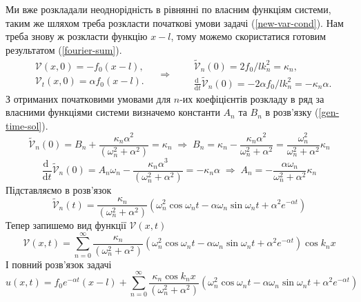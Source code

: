 Ми вже розкладали неоднорідність в рівнянні по власним функціям системи, таким же шляхом треба розкласти початкові умови задачі (\ref{new-var-cond}). Нам треба знову ж розкласти функцію $x - l$, тому можемо скористатися готовим результатом (\ref{fourier-sum}).
\begin{equation}
    \begin{aligned} %
        &\mathcal{V}(x,0) = - f_0 (x-l),\\
        &\mathcal{V}_t(x,0) = \alpha f_0 (x-l).
    \end{aligned} 
    \quad\Rightarrow\quad
    \begin{aligned} %
        &\widetilde{\mathcal{V}}_n(0) = 2 f_0/l k_n^2 = \kappa_n,\\
        &\frac{\mathrm{d}\;}{\mathrm{d}t}\widetilde{\mathcal{V}}_n(0) = -2\alpha f_0/lk_n^2 = -\kappa_n\alpha.
    \end{aligned} 
\end{equation}
З отриманих початковими умовами для $n$-их коефіцієнтів розкладу в ряд за власними функціями системи визначемо константи $A_n$ та $B_n$ в розв'язку (\ref{gen-time-sol}). 
\begin{equation*}
    \widetilde{\mathcal{V}}_n(0) = B_n + \frac{\kappa_n\alpha^2}{(\omega_n^2 + \alpha^2)} = \kappa_n
    \;\Rightarrow\;
    B_n  = \kappa_n - \frac{\kappa_n\alpha^2}{\omega_n^2 + \alpha^2} = \frac{\omega_n^2}{\omega_n^2 + \alpha^2} \kappa_n
\end{equation*}
\begin{equation*}
    \frac{\mathrm{d}\;}{\mathrm{d}t}\widetilde{\mathcal{V}}_n(0) = A_n\omega_n - \frac{\kappa_n\alpha^3}{(\omega_n^2 + \alpha^2)} = -\kappa_n\alpha
    \;\Rightarrow\;
    A_n = -\frac{\alpha\omega_n}{\omega_n^2 + \alpha^2} \kappa_n
\end{equation*}
Підставляємо в розв'язок
\begin{equation} \label{unic-time-sol}
    \widetilde{\mathcal{V}}_n(t) = \frac{\kappa_n}{(\omega_n^2 + \alpha^2)} \left(\omega_n^2\cos\omega_nt - \alpha\omega_n\sin\omega_nt +  \alpha^2e^{-\alpha t}\right)
\end{equation}  
Тепер запишемо вид функції $\mathcal{V}(x,t)$
\begin{equation}
    \mathcal{V}(x,t) = \sum_{n=0}^\infty \frac{\kappa_n}{(\omega_n^2 + \alpha^2)} \left(\omega_n^2\cos\omega_nt - \alpha\omega_n\sin\omega_nt +  \alpha^2e^{-\alpha t}\right) \cos k_n x
\end{equation}
І повний розв'язок задачі
\begin{equation}
    u(x,t) = f_0 e^{-\alpha t} (x - l) +  \sum_{n=0}^\infty \frac{\kappa_n \cos k_n x}{(\omega_n^2 + \alpha^2)} \left(\omega_n^2\cos\omega_nt - \alpha\omega_n\sin\omega_nt +  \alpha^2e^{-\alpha t}\right) 
\end{equation}

%
